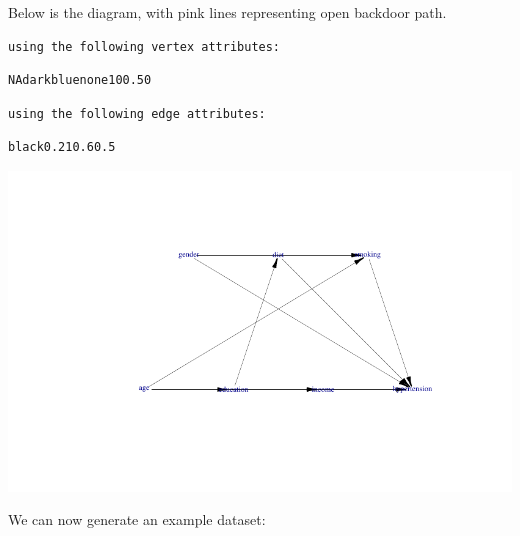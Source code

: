 \documentclass[
  letterpaper,
  DIV=11,
  numbers=noendperiod]{scrreprt}
\newenvironment{Shaded}{\begin{snugshade}}{\end{snugshade}}
\newcommand{\AttributeTok}[1]{\textcolor[rgb]{0.40,0.45,0.13}{#1}}
\newcommand{\DecValTok}[1]{\textcolor[rgb]{0.68,0.00,0.00}{#1}}
\newcommand{\FunctionTok}[1]{\textcolor[rgb]{0.28,0.35,0.67}{#1}}
\newcommand{\NormalTok}[1]{\textcolor[rgb]{0.00,0.23,0.31}{#1}}
\newcommand{\OtherTok}[1]{\textcolor[rgb]{0.00,0.23,0.31}{#1}}
\newcommand{\SpecialCharTok}[1]{\textcolor[rgb]{0.37,0.37,0.37}{#1}}
\newcommand{\StringTok}[1]{\textcolor[rgb]{0.13,0.47,0.30}{#1}}
\begin{document}
Below is the diagram, with pink lines representing open backdoor path.

\begin{verbatim}
using the following vertex attributes: 
\end{verbatim}

\begin{verbatim}
NAdarkbluenone100.50
\end{verbatim}

\begin{verbatim}
using the following edge attributes: 
\end{verbatim}

\begin{verbatim}
black0.210.60.5
\end{verbatim}

\includegraphics{chapter_07_files/figure-pdf/unnamed-chunk-3-1.pdf}

We can now generate an example dataset:

\begin{Shaded}
\end{Shaded}
\end{document}
